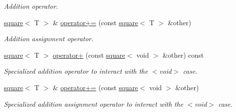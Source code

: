 \begin{DoxyCompactItemize}
\begin{DoxyCompactList}\small\item\em Addition operator. \end{DoxyCompactList}\item 
\hyperlink{structsquare}{square}$<$ T $>$ \& \hyperlink{structsquare_a449426e468a40af9fbc7a06128553ba1}{operator+=} (const \hyperlink{structsquare}{square}$<$ T $>$ \&other)\hypertarget{structsquare_a449426e468a40af9fbc7a06128553ba1}{}\label{structsquare_a449426e468a40af9fbc7a06128553ba1}

\begin{DoxyCompactList}\small\item\em Addition assignment operator. \end{DoxyCompactList}\item 
\hyperlink{structsquare}{square}$<$ T $>$ \hyperlink{structsquare_aec87c274a7892ecfbcd744c143b65943}{operator+} (const \hyperlink{structsquare}{square}$<$ void $>$ \&other) const \hypertarget{structsquare_aec87c274a7892ecfbcd744c143b65943}{}\label{structsquare_aec87c274a7892ecfbcd744c143b65943}

\begin{DoxyCompactList}\small\item\em Specialized addition operator to interact with the $<$void$>$ case. \end{DoxyCompactList}\item 
\hyperlink{structsquare}{square}$<$ T $>$ \& \hyperlink{structsquare_acbf660ad49decf4178fbf843a7912251}{operator+=} (const \hyperlink{structsquare}{square}$<$ void $>$ \&other)\hypertarget{structsquare_acbf660ad49decf4178fbf843a7912251}{}\label{structsquare_acbf660ad49decf4178fbf843a7912251}

\begin{DoxyCompactList}\small\item\em Specialized addition assignment operator to interact with the $<$void$>$ case. \end{DoxyCompactList}\end{DoxyCompactItemize}
